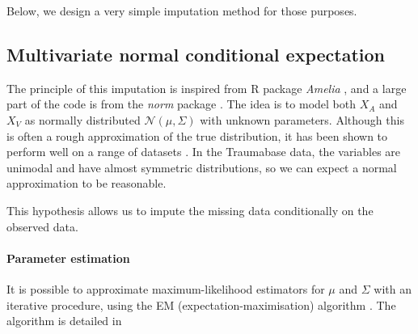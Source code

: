 Below, we design a very simple imputation method for those purposes.

		\subsection{Multivariate normal conditional expectation}
The principle of this imputation is inspired from R package \emph{Amelia} \cite{ref_amelia}, and a large part of the code is from the \emph{norm} package \cite{pkg_norm}. The idea is to model both $X_A$ and $X_V$ as normally distributed $\mathcal{N}(\mu, \Sigma)$ with unknown parameters. Although this is often a rough approximation of the true distribution, it has been shown to  perform well on a range of datasets \cite{MICE_founding}\cite{schafer1998multiple}. In the Traumabase data, the variables are unimodal and have almost symmetric distributions, so we can expect a normal approximation to be reasonable.

This hypothesis allows us to impute the missing data conditionally on the observed data.

\paragraph{Parameter estimation}
It is possible to approximate maximum-likelihood estimators for $\mu$ and $\Sigma$ with an iterative procedure, using the EM (expectation-maximisation) algorithm \cite{EM}. The algorithm is detailed in \cite[Chapter 5.3]{em_normal_fit}

